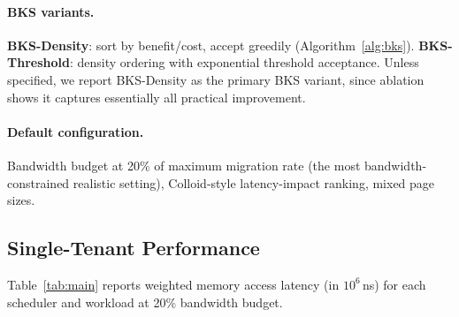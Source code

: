 \documentclass{article}
\begin{document}
\paragraph{BKS variants.} \textbf{BKS-Density}: sort by benefit/cost, accept greedily (Algorithm~\ref{alg:bks}). \textbf{BKS-Threshold}: density ordering with exponential threshold acceptance. Unless specified, we report BKS-Density as the primary BKS variant, since ablation shows it captures essentially all practical improvement.

\paragraph{Default configuration.} Bandwidth budget at 20\% of maximum migration rate (the most bandwidth-constrained realistic setting), Colloid-style latency-impact ranking, mixed page sizes.

\subsection{Single-Tenant Performance}

Table~\ref{tab:main} reports weighted memory access latency (in $10^6$\,ns) for each scheduler and workload at 20\% bandwidth budget.
\end{document}
